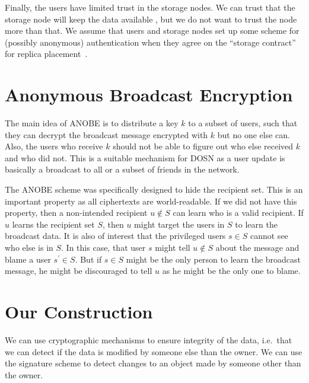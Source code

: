Finally, the users have limited trust in the storage nodes.
We can trust that the storage node will keep the data available 
\cite{dataavailability,replicaplacement}, but we do not want to trust the node 
more than that.
We assume that users and storage nodes set up some scheme for (possibly 
anonymous) authentication when they agree on the \enquote{storage contract} for 
replica placement~\cite{replicaplacement}.


\section{Anonymous Broadcast Encryption}\label{sec:ANOBE}
The main idea of \ac{ANOBE} is to distribute a key \(k\) to a subset of users, 
such that they can decrypt the broadcast message encrypted with \(k\) but no 
one else can.
Also, the users who receive \(k\) should not be able to figure out who else 
received \(k\) and who did not.
This is a suitable mechanism for \ac{DOSN} as a user update is basically 
a broadcast to all or a subset of friends in the network.

The \ac{ANOBE} scheme was specifically designed to hide the recipient set.
This is an important property as all ciphertexts are world-readable.
If we did not have this property, then a non-intended recipient \(u\notin S\) 
can learn who is a valid recipient.
If \(u\) learns the recipient set \(S\), then \(u\) might target the users in 
\(S\) to learn the broadcast data.
It is also of interest that the privileged users \(s\in S\) cannot see who else 
is in \(S\).
In this case, that user \(s\) might tell \(u\notin S\) about the message and 
blame a user \(s^\prime\in S\).
But if \(s\in S\) might be the only person to learn the broadcast message, he 
might be discouraged to tell \(u\) as he might be the only one to blame.


\section{Our Construction}\label{sec:Contribution}

We can use cryptographic mechanisms to ensure integrity of the data, i.e.\ that 
we can detect if the data is modified by someone else than the owner.
We can use the signature scheme to detect changes to an object made by someone 
other than the owner.

